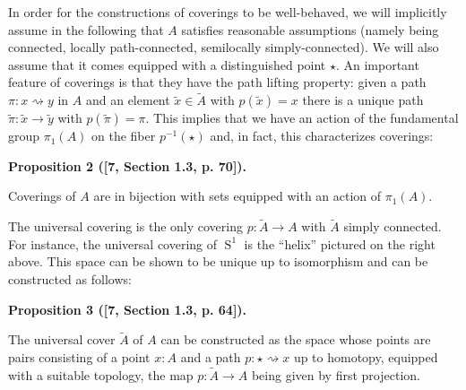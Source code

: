 In order for the constructions of coverings to be well-behaved, we will implicitly assume in the following that $A$ satisfies reasonable assumptions (namely being connected, locally path-connected, semilocally simply-connected). We will also assume that it comes equipped with a distinguished point $\star$. An important feature of coverings is that they have the path lifting property: given a path $\pi:x\rightsquigarrow y$ in $A$ and an element $\tilde{x}\in\tilde{A}$ with $p(\tilde{x})=x$ there is a unique path $\tilde{\pi}:\tilde{x}\to\tilde{y}$ with $p(\tilde{\pi})=\pi$. This implies that we have an action of the fundamental group $\pi_{1}(A)$ on the fiber $p^{-1}(\star)$ and, in fact, this characterizes coverings:\par
 
 
 
\par\medskip\noindent\textbf{Proposition 2 ([7, Section 1.3, p. 70]).}\par
 
 
Coverings of $A$ are in bijection with sets equipped with an action of $\pi_{1}(A)$.\par
 
 
 
 
The universal covering is the only covering $p:\tilde{A}\to A$ with $\tilde{A}$ simply connected. For instance, the universal covering of $\operatorname{S}^{1}$ is the “helix” pictured on the right above. This space can be shown to be unique up to isomorphism and can be constructed as follows:\par
 
 
 
\par\medskip\noindent\textbf{Proposition 3 ([7, Section 1.3, p. 64]).}\par
 
 
The universal cover $\tilde{A}$ of $A$ can be constructed as the space whose points are pairs consisting of a point $x:A$ and a path $p:\star\rightsquigarrow x$ up to homotopy, equipped with a suitable topology, the map $p:\tilde{A}\to A$ being given by first projection.\par
 
